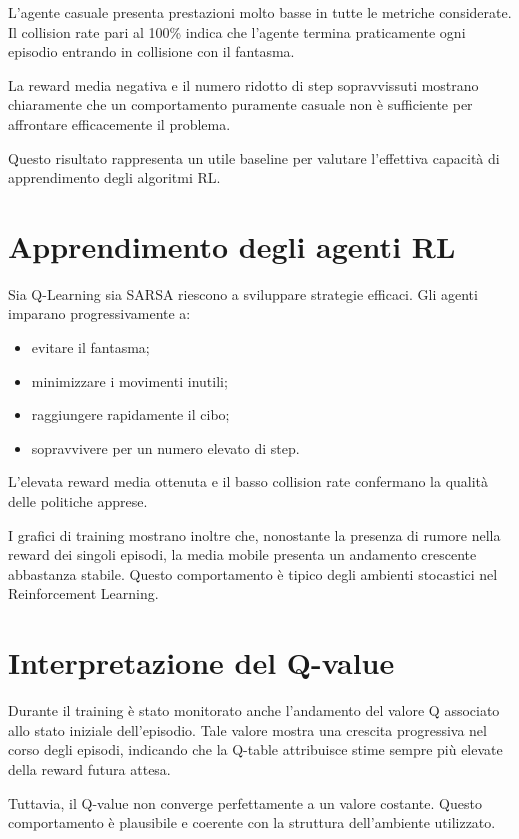 \documentclass[12pt,a4paper]{report}
\begin{document}
L’agente casuale presenta prestazioni molto basse in tutte le metriche considerate. Il collision rate pari al 100\% indica che l’agente termina praticamente ogni episodio entrando in collisione con il fantasma.

La reward media negativa e il numero ridotto di step sopravvissuti mostrano chiaramente che un comportamento puramente casuale non è sufficiente per affrontare efficacemente il problema.

Questo risultato rappresenta un utile baseline per valutare l’effettiva capacità di apprendimento degli algoritmi RL.

\section{Apprendimento degli agenti RL}

Sia Q-Learning sia SARSA riescono a sviluppare strategie efficaci. Gli agenti imparano progressivamente a:

\begin{itemize}
    \item evitare il fantasma;
    \item minimizzare i movimenti inutili;
    \item raggiungere rapidamente il cibo;
    \item sopravvivere per un numero elevato di step.
\end{itemize}

L’elevata reward media ottenuta e il basso collision rate confermano la qualità delle politiche apprese.

I grafici di training mostrano inoltre che, nonostante la presenza di rumore nella reward dei singoli episodi, la media mobile presenta un andamento crescente abbastanza stabile. Questo comportamento è tipico degli ambienti stocastici nel Reinforcement Learning.

\section{Interpretazione del Q-value}

Durante il training è stato monitorato anche l’andamento del valore Q associato allo stato iniziale dell’episodio. Tale valore mostra una crescita progressiva nel corso degli episodi, indicando che la Q-table attribuisce stime sempre più elevate della reward futura attesa.

Tuttavia, il Q-value non converge perfettamente a un valore costante. Questo comportamento è plausibile e coerente con la struttura dell’ambiente utilizzato.
\end{document}
